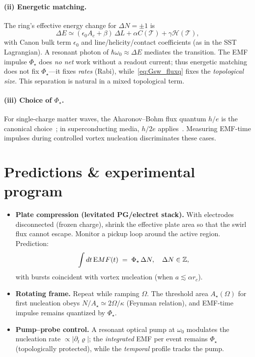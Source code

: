 \documentclass[11pt,a4paper]{article}
\begin{document}
\paragraph{(ii) Energetic matching.}
    The ring’s effective energy change for $\Delta N=\pm1$ is
    \begin{equation}
    \Delta E \simeq (\epsilon_0 A_c + \beta)\,\Delta L + \alpha C(\mathcal T)+\gamma \mathcal H(\mathcal T),
    \end{equation}
    with Canon bulk term $\epsilon_0$ and line/helicity/contact coefficients (as in the SST Lagrangian). A resonant photon of $\hbar\omega_0\!\approx\!\Delta E$ mediates the transition. The EMF impulse $\Phi_\star$ does \emph{no net} work without a readout current; thus energetic matching does not fix $\Phi_\star$—it fixes \emph{rates} (Rabi), while~\eqref{eq:Gsw_fluxq} fixes the \emph{topological size}. This separation is natural in a mixed topological term.

\paragraph{(iii) Choice of $\Phi_\star$.}
    For single-charge matter waves, the Aharonov--Bohm flux quantum $h/e$ is the canonical choice~\cite{Aharonov1959}; in superconducting media, $h/2e$ applies~\cite{Tinkham2004}. Measuring EMF-time impulses during controlled vortex nucleation discriminates these cases.

\section{Predictions \& experimental program}
\begin{itemize}
\item \textbf{Plate compression (levitated PG/electret stack).} With electrodes disconnected (frozen charge), shrink the effective plate area so that the swirl flux cannot escape. Monitor a pickup loop around the active region. Prediction:
\[
    \int dt\,{\textrm EMF}(t) \;=\; \Phi_\star\,\Delta N, \quad \Delta N\in\mathbb Z,
\]
with bursts coincident with vortex nucleation (when $a\lesssim\alpha r_c$).
\item \textbf{Rotating frame.} Repeat while ramping $\Omega$. The threshold area $A_\star(\Omega)$ for first nucleation obeys $N/A_\star\simeq 2\Omega/\kappa$ (Feynman relation), and EMF-time impulse remains quantized by $\Phi_\star$.
\item \textbf{Pump--probe control.} A resonant optical pump at $\omega_0$ modulates the nucleation rate $\propto |\partial_t \bm{\varrho}|$; the \emph{integrated} EMF per event remains $\Phi_\star$ (topologically protected), while the \emph{temporal} profile tracks the pump.
\end{itemize}
\end{document}
